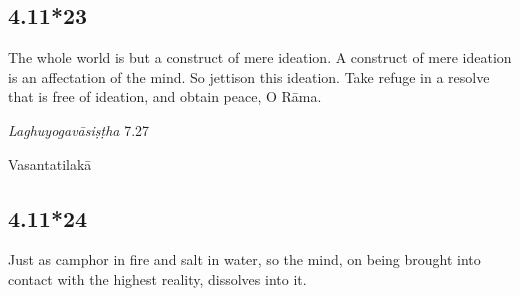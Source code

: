 \begin{ekdosis}

\subsection*{4.11*23}
\begin{translation}[hp04_011_23]
The whole world is but a construct of mere ideation. A construct of mere ideation is an affectation of the mind. So jettison this ideation. Take refuge in a resolve that is free of ideation, and obtain peace, O Rāma.
\end{translation}

\begin{sources}[hp04_011_23]
\emph{Laghuyogavāsiṣṭha} 7.27
\begin{versinnote}
\end{versinnote}
\end{sources}


\begin{philcomm}[hp04_011_23]

\end{philcomm}

\begin{metre}[hp04_011_23]
Vasantatilakā
\end{metre}

\subsection*{4.11*24}
\begin{translation}[hp04_011_24]
Just as camphor in fire and salt in water, so the mind, on being brought into contact with the highest reality, dissolves into it.
\end{translation}



\end{ekdosis}
